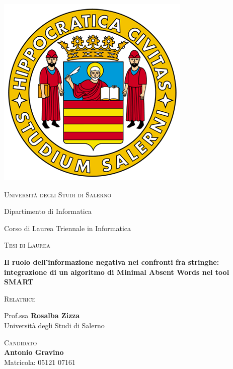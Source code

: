 \documentclass{article}
\begin{document}
    \begin{center}
    
        \includegraphics[scale=0.2]{assets/logo_standard.png}
    
        \vspace{2mm}
    
        \textsc{\huge Università degli Studi di Salerno}
        
        \vspace{5mm}
        
        {\LARGE Dipartimento di Informatica}
        
        {\LARGE Corso di Laurea Triennale in Informatica}
        
        \vspace{10mm}
        
        \textsc{\huge Tesi di Laurea}
        
        \vspace{10mm}
        
        \textbf{\huge Il ruolo dell'informazione negativa nei confronti fra stringhe: integrazione di un algoritmo di Minimal Absent Words nel tool SMART}
        
    \end{center}
    
        \vspace{20mm}
    
        {\large {}
            \begin{multicols}{2}
                \begin{adjustwidth}{0pt}{0pt}\textsc{Relatrice}\end{adjustwidth}
                Prof.ssa \textbf{Rosalba Zizza}\\
                Università degli Studi di Salerno
                
                \columnbreak
                
                \hspace*{\fill}\textsc{Candidato}\\
                \hspace*{\fill}\textbf{Antonio Gravino}\\
                \hspace*{\fill}Matricola: 05121 07161
            \end{multicols}
        }
        
\end{document}
